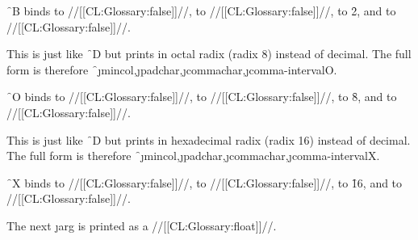 \f{~B} binds
      to //[[CL:Glossary:false]]//,
      to //[[CL:Glossary:false]]//,
      to \f{2},
 and  to //[[CL:Glossary:false]]//.



\endsubsubsection%




This is just like \f{~D} but prints in octal radix (radix 8)
instead of decimal.  The full form is therefore
\f{~\j{mincol},\j{padchar},\j{commachar},\j{comma-interval}O}.

\f{~O} binds
      to //[[CL:Glossary:false]]//,
      to //[[CL:Glossary:false]]//,
      to \f{8},
 and  to //[[CL:Glossary:false]]//.



\endsubsubsection%




This is just like \f{~D} but prints in hexadecimal radix
(radix 16) instead of decimal.  The full form is therefore
\f{~\j{mincol},\j{padchar},\j{commachar},\j{comma-interval}X}.

\f{~X} binds
      to //[[CL:Glossary:false]]//,
      to //[[CL:Glossary:false]]//,
      to \f{16},
 and  to //[[CL:Glossary:false]]//.



\endsubsubsection%

\endsubsection%





The next \j{arg} is printed as a //[[CL:Glossary:float]]//.


